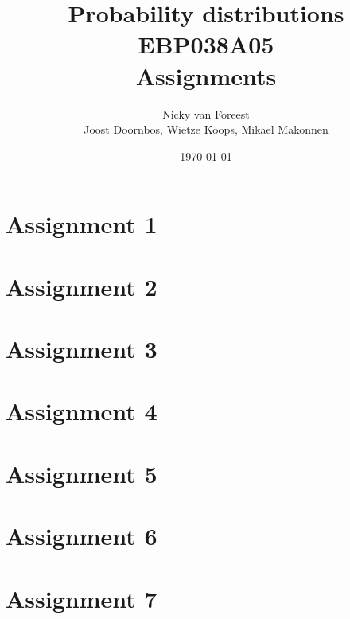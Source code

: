 \documentclass[a4paper,12pt]{article}
\author{Nicky van Foreest \\
  Joost Doornbos, Wietze Koops, Mikael Makonnen
}
\date{\today}
\title{Probability distributions EBP038A05\\
Assignments}
\begin{document}
\maketitle
\tableofcontents





\section{Assignment 1}





\section{Assignment 2}




\section{Assignment 3}





\section{Assignment 4}




\section{Assignment 5}





\section{Assignment 6}






\section{Assignment 7}








% 
% 
\end{document}
